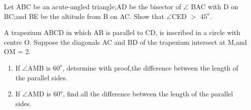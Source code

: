 \item Let ABC be an acute-angled triangle;AD be the bisector of $\angle$ BAC with D on BC;and BE be the altitude from B on AC. Show that $\angle$CED $>$ $45^{o}$.

\item A trapezium ABCD in which AB is parallel to CD, is inscribed in a circle with centre O. Suppose the diagonals AC and BD of the trapezium intersect at M,and OM = 2.
\begin{enumerate}
\item If $\angle$AMB is $60^{o}$, determine with proof,the difference between the length of the parallel sides.
\item If $\angle$AMD is $60^{o}$, find all the difference between the length of the parallel sides.
\end{enumerate}
